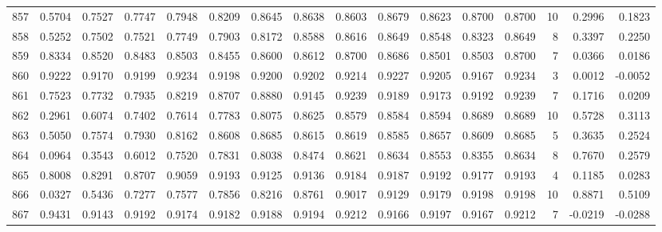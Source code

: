 \begin{tabular}{lrrrrrrrrrrrrrrr}
857 &      0.5704 &  0.7527 &  0.7747 &  0.7948 &  0.8209 &  0.8645 &  0.8638 &  0.8603 &  0.8679 &  0.8623 &   0.8700 &     0.8700 &     10 &                    0.2996 &                     0.1823 \\
858 &      0.5252 &  0.7502 &  0.7521 &  0.7749 &  0.7903 &  0.8172 &  0.8588 &  0.8616 &  0.8649 &  0.8548 &   0.8323 &     0.8649 &      8 &                    0.3397 &                     0.2250 \\
859 &      0.8334 &  0.8520 &  0.8483 &  0.8503 &  0.8455 &  0.8600 &  0.8612 &  0.8700 &  0.8686 &  0.8501 &   0.8503 &     0.8700 &      7 &                    0.0366 &                     0.0186 \\
860 &      0.9222 &  0.9170 &  0.9199 &  0.9234 &  0.9198 &  0.9200 &  0.9202 &  0.9214 &  0.9227 &  0.9205 &   0.9167 &     0.9234 &      3 &                    0.0012 &                    -0.0052 \\
861 &      0.7523 &  0.7732 &  0.7935 &  0.8219 &  0.8707 &  0.8880 &  0.9145 &  0.9239 &  0.9189 &  0.9173 &   0.9192 &     0.9239 &      7 &                    0.1716 &                     0.0209 \\
862 &      0.2961 &  0.6074 &  0.7402 &  0.7614 &  0.7783 &  0.8075 &  0.8625 &  0.8579 &  0.8584 &  0.8594 &   0.8689 &     0.8689 &     10 &                    0.5728 &                     0.3113 \\
863 &      0.5050 &  0.7574 &  0.7930 &  0.8162 &  0.8608 &  0.8685 &  0.8615 &  0.8619 &  0.8585 &  0.8657 &   0.8609 &     0.8685 &      5 &                    0.3635 &                     0.2524 \\
864 &      0.0964 &  0.3543 &  0.6012 &  0.7520 &  0.7831 &  0.8038 &  0.8474 &  0.8621 &  0.8634 &  0.8553 &   0.8355 &     0.8634 &      8 &                    0.7670 &                     0.2579 \\
865 &      0.8008 &  0.8291 &  0.8707 &  0.9059 &  0.9193 &  0.9125 &  0.9136 &  0.9184 &  0.9187 &  0.9192 &   0.9177 &     0.9193 &      4 &                    0.1185 &                     0.0283 \\
866 &      0.0327 &  0.5436 &  0.7277 &  0.7577 &  0.7856 &  0.8216 &  0.8761 &  0.9017 &  0.9129 &  0.9179 &   0.9198 &     0.9198 &     10 &                    0.8871 &                     0.5109 \\
867 &      0.9431 &  0.9143 &  0.9192 &  0.9174 &  0.9182 &  0.9188 &  0.9194 &  0.9212 &  0.9166 &  0.9197 &   0.9167 &     0.9212 &      7 &                   -0.0219 &                    -0.0288 \\

\end{tabular}
